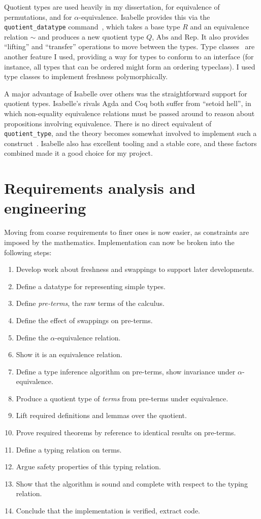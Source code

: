 Quotient types are used heavily in my dissertation, for equivalence of permutations, and for \(\alpha\)-equivalence.
Isabelle provides this via the \texttt{quotient\_datatype} command~\cite{isabelle-quotient}, which takes a base type \(R\) and an equivalence relation \(\sim\) and produces a new quotient type \(Q\), \(\mathrm{Abs}\) and \(\mathrm{Rep}\).
It also provides ``lifting'' and ``transfer'' operations to move between the types.
Type classes~\cite{isabelle-typeclasses} are another feature I used, providing a way for types to conform to an interface (for instance, all types that can be ordered might form an ordering typeclass).
I used type classes to implement freshness polymorphically.

A major advantage of Isabelle over others was the straightforward support for quotient types.
Isabelle's rivals Agda and Coq both suffer from ``setoid hell'', in which non-equality equivalence relations must be passed around to reason about propositions involving equivalence.
There is no direct equivalent of \texttt{quotient\_type}, and the theory becomes somewhat involved to implement such a construct~\cite{quotients-hard}.
Isabelle also has excellent tooling and a stable core, and these factors combined made it a good choice for my project.

\section{Requirements analysis and engineering}
\label{sec:requirements}
Moving from coarse requirements to finer ones is now easier, as constraints are imposed by the mathematics.
Implementation can now be broken into the following steps:
\begin{enumerate}
\item
Develop work about freshness and swappings to support later developments.
\item
Define a datatype for representing simple types.
\item
Define \emph{pre-terms}, the raw terms of the calculus.
\item
Define the effect of swappings on pre-terms.
\item
Define the \(\alpha\)-equivalence relation.
\item
Show it is an equivalence relation.
\item
Define a type inference algorithm on pre-terms, show invariance under \(\alpha\)-equivalence.
\item
Produce a quotient type of \emph{terms} from pre-terms under equivalence.
\item
Lift required definitions and lemmas over the quotient.
\item
Prove required theorems by reference to identical results on pre-terms.
\item
Define a typing relation on terms.
\item
Argue safety properties of this typing relation.
\item
Show that the algorithm is sound and complete with respect to the typing relation.
\item
Conclude that the implementation is verified, extract code.
\end{enumerate}

